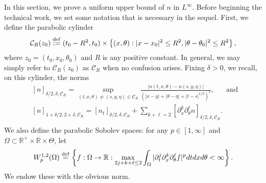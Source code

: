 \documentclass[11pt]{article}    %
\newcommand{\R}{\mathbb{R}}
\begin{document}
In this section, we prove a uniform upper bound of $n$ in $L^\infty$.  %
Before beginning the technical work, we set some notation that is necessary in the sequel.  First, we define the parabolic cylinder 
\[
	\mathcal{C}_R(z_0) \stackrel{\rm def}{:=} (t_0 - R^2,t_0)\times \left\{ (x,\theta): \vert x - x_0 \vert^2 \leq R^2, \vert \theta - \theta_0 \vert^2 \leq R^2  \right\},
\]
where $z_0 = (t_0,x_0,\theta_0)$ and $R$ is any positive constant.  %
In general, we may simply refer to $\mathcal{C}_R(z_0)$ as $\mathcal{C}_R$ when no confusion arises.  
Fixing $\delta > 0$, we recall, on this cylinder, the norms
\[\begin{split}
	& [n]_{\delta/2,\delta, \mathcal{C}_R} = \sup_{(t,x,\theta) \neq (s,y,\eta) \in \mathcal{C}_R} \frac{|n(t,x,\theta) - n(s,y,\eta)|}{(|x-y| + |\theta - \eta| + |t-s|^{1/2})^\delta},~~~~~~\text{ and }\\
	& [n]_{1+\delta/2,2+\delta, \mathcal{C}_R} = [n_t]_{\delta/2,\delta, \mathcal{C}_R} + \sum_{k+\ell = 2} [\partial_x^k\partial_\theta^\ell n]_{\delta/2,\delta,\mathcal{C}_R}.\\
\end{split}\]
We also define the parabolic Sobolev spaces: for any $p \in [1,\infty]$ and $\Omega \subset \R^+ \times \R\times \Theta$, let
\[\begin{split}
	W^{1,2}_p(\Omega) \stackrel{\rm def}{=}
		\left\{ f: \Omega \to \R: \max_{2j + k + \ell \leq 2} \int_{\Omega} |\partial_t^j \partial_x^k \partial_\theta^\ell f|^p dtdxd\theta < \infty \right\}.
\end{split}\]
We endow these with the obvious norm.
\end{document}
